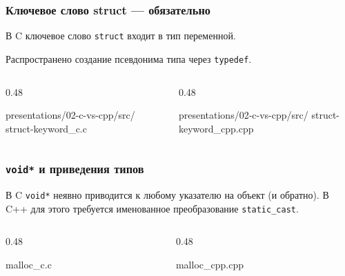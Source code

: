 \documentclass[compress, 8pt, aspectratio=169]{beamer}
\begin{document}
\begin{frame}[fragile]

    \frametitle{Ключевое слово struct --- обязательно}

    \begin{myitemize}

        \item В C ключевое слово \texttt{struct} входит в
            тип переменной.

        \item Распространено создание псевдонима типа
            через \texttt{typedef}.

    \end{myitemize}

    \begin{columns}[T]

        \begin{column}{0.48\textwidth}

                {presentations/02-c-vs-cpp/src/}
                {struct-keyword_c.c}

        \end{column}

        \begin{column}{0.48\textwidth}

                {presentations/02-c-vs-cpp/src/}
                {struct-keyword_cpp.cpp}

        \end{column}

    \end{columns}

\end{frame}

\begin{frame}[fragile]

    \frametitle{\texttt{void*} и приведения типов}

    В C \texttt{void*} неявно приводится к любому указателю
    на объект (и обратно).
    В C++ для этого требуется именованное преобразование
    \texttt{static\_cast}.

    \begin{columns}[T]

        \begin{column}{0.48\textwidth}

                {malloc_c.c}

        \end{column}

        \begin{column}{0.48\textwidth}

                {malloc_cpp.cpp}

        \end{column}

    \end{columns}

\end{frame}
\end{document}
